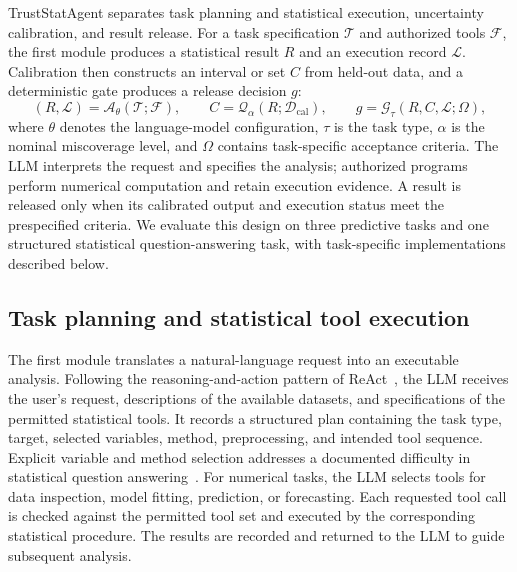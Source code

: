 \documentclass[preprint,12pt,authoryear]{elsarticle}
\begin{document}
TrustStatAgent separates task planning and statistical execution, uncertainty calibration, and result release. For a task specification $\mathcal{T}$ and authorized tools $\mathcal{F}$, the first module produces a statistical result $R$ and an execution record $\mathcal{L}$. Calibration then constructs an interval or set $C$ from held-out data, and a deterministic gate produces a release decision $g$:
\begin{equation}
    (R,\mathcal{L})=\mathcal{A}_{\theta}(\mathcal{T};\mathcal{F}),\qquad
    C=\mathcal{Q}_{\alpha}(R;\mathcal{D}_{\mathrm{cal}}),\qquad
    g=\mathcal{G}_{\tau}(R,C,\mathcal{L};\Omega),
    \label{eq:framework}
\end{equation}
where $\theta$ denotes the language-model configuration, $\tau$ is the task type, $\alpha$ is the nominal miscoverage level, and $\Omega$ contains task-specific acceptance criteria. The LLM interprets the request and specifies the analysis; authorized programs perform numerical computation and retain execution evidence. A result is released only when its calibrated output and execution status meet the prespecified criteria. We evaluate this design on three predictive tasks and one structured statistical question-answering task, with task-specific implementations described below.

\subsection{Task planning and statistical tool execution}
\label{sec:execution}

The first module translates a natural-language request into an executable analysis. Following the reasoning-and-action pattern of ReAct~\citep{yao2023react}, the LLM receives the user's request, descriptions of the available datasets, and specifications of the permitted statistical tools. It records a structured plan containing the task type, target, selected variables, method, preprocessing, and intended tool sequence. Explicit variable and method selection addresses a documented difficulty in statistical question answering~\citep{zhu2024large}. For numerical tasks, the LLM selects tools for data inspection, model fitting, prediction, or forecasting. Each requested tool call is checked against the permitted tool set and executed by the corresponding statistical procedure. The results are recorded and returned to the LLM to guide subsequent analysis.
\end{document}

